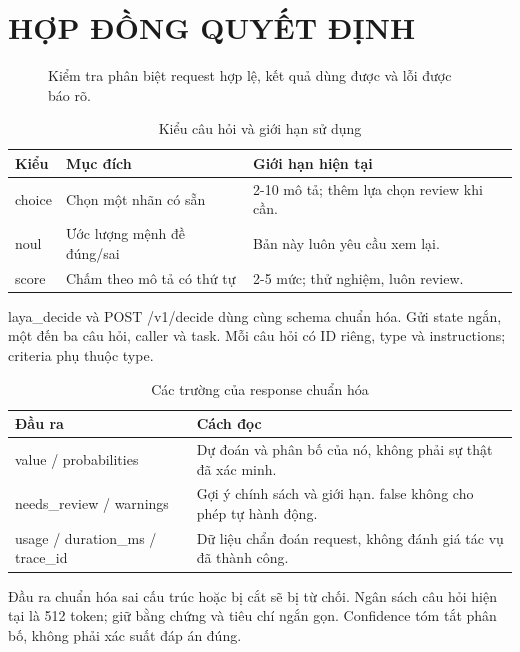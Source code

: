 \documentclass[10pt,a4paper]{article}
\begin{document}
\section{HỢP ĐỒNG QUYẾT ĐỊNH}
\begin{figure}[H]
\centering
{}
\caption{Kiểm tra phân biệt request hợp lệ, kết quả dùng được và lỗi được báo rõ.}
\end{figure}
\begin{table}[H]
\centering\small
\renewcommand{\arraystretch}{1.15}
\begin{tabularx}{\linewidth}{@{}YYY@{}}
\toprule
\textbf{Kiểu} & \textbf{Mục đích} & \textbf{Giới hạn hiện tại} \\
\midrule
choice & Chọn một nhãn có sẵn & 2-10 mô tả; thêm lựa chọn review khi cần. \\
noul & Ước lượng mệnh đề đúng/sai & Bản này luôn yêu cầu xem lại. \\
score & Chấm theo mô tả có thứ tự & 2-5 mức; thử nghiệm, luôn review. \\
\bottomrule
\end{tabularx}
\caption{Kiểu câu hỏi và giới hạn sử dụng}
\end{table}
laya\_decide và POST /v1/decide dùng cùng schema chuẩn hóa. Gửi state ngắn, một đến ba câu hỏi, caller và task. Mỗi câu hỏi có ID riêng, type và instructions; criteria phụ thuộc type.

\begin{table}[H]
\centering\small
\renewcommand{\arraystretch}{1.15}
\begin{tabularx}{\linewidth}{@{}YY@{}}
\toprule
\textbf{Đầu ra} & \textbf{Cách đọc} \\
\midrule
value / probabilities & Dự đoán và phân bố của nó, không phải sự thật đã xác minh. \\
needs\_review / warnings & Gợi ý chính sách và giới hạn. false không cho phép tự hành động. \\
usage / duration\_ms / trace\_id & Dữ liệu chẩn đoán request, không đánh giá tác vụ đã thành công. \\
\bottomrule
\end{tabularx}
\caption{Các trường của response chuẩn hóa}
\end{table}
Đầu ra chuẩn hóa sai cấu trúc hoặc bị cắt sẽ bị từ chối. Ngân sách câu hỏi hiện tại là 512 token; giữ bằng chứng và tiêu chí ngắn gọn. Confidence tóm tắt phân bố, không phải xác suất đáp án đúng. \cite{r4}
\end{document}
